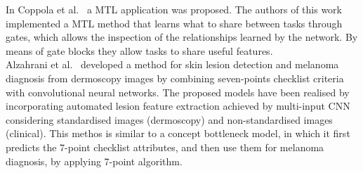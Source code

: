 In Coppola et al.~\cite{mtl7ptCoppola} a MTL application was proposed. The authors of this work implemented a MTL method that learns what to share between tasks through gates, which allows the inspection of the relationships learned by the network. By means of gate blocks they allow tasks to share useful features. \\ 
Alzahrani et al.~\cite{7ptCNNforMel} developed a method for skin lesion detection and melanoma diagnosis from dermoscopy images by combining seven-points checklist criteria with convolutional neural networks. The proposed models have been realised by incorporating automated lesion feature extraction achieved by multi-input CNN considering standardised images (dermoscopy) and non-standardised images (clinical). This methos is similar to a concept bottleneck model, in which it first predicts the 7-point checklist attributes, and then use them for melanoma diagnosis, by applying 7-point algorithm.

 
